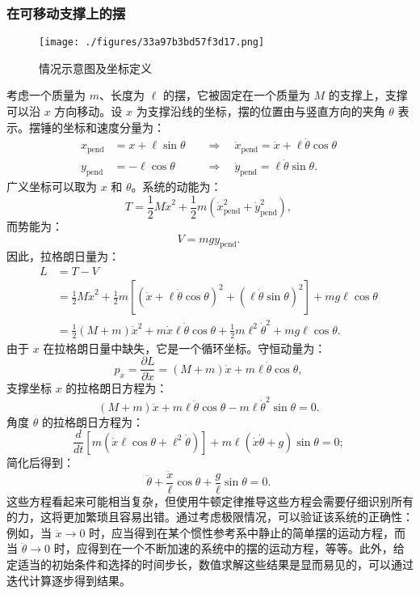 \subsubsection{在可移动支撑上的摆}
\begin{figure}[ht]
\centering
\texttt{[image: ./figures/33a97b3bd57f3d17.png]}
\caption{情况示意图及坐标定义} \label{fig_LGL_8}
\end{figure}
考虑一个质量为 \( m \)、长度为 \( \ell \) 的摆，它被固定在一个质量为 \( M \) 的支撑上，支撑可以沿 \( x \) 方向移动。设 \( x \) 为支撑沿线的坐标，摆的位置由与竖直方向的夹角 \( \theta \) 表示。摆锤的坐标和速度分量为：
\[
\begin{array}{rll}
x_{\mathrm{pend}} &= x + \ell \sin \theta & \quad \Rightarrow \quad \dot{x}_{\mathrm{pend}} = \dot{x} + \ell \dot{\theta} \cos \theta \\
y_{\mathrm{pend}} &= -\ell \cos \theta & \quad \Rightarrow \quad \dot{y}_{\mathrm{pend}} = \ell \dot{\theta} \sin \theta.
\end{array}~
\]
广义坐标可以取为 \( x \) 和 \( \theta \)。系统的动能为：
\[
T = \frac{1}{2} M \dot{x}^2 + \frac{1}{2} m \left( \dot{x}_{\mathrm{pend}}^2 + \dot{y}_{\mathrm{pend}}^2 \right),~
\]
而势能为：
\[
V = mg y_{\mathrm{pend}}.~
\]
因此，拉格朗日量为：
\begin{equation}
\begin{aligned}
L &= T - V\\
 &= \frac{1}{2} M \dot{x}^2 + \frac{1}{2} m \left[ \left( \dot{x} + \ell \dot{\theta} \cos \theta \right)^2 + \left( \ell \dot{\theta} \sin \theta \right)^2 \right] + mg \ell \cos \theta \\
 &= \frac{1}{2} (M + m) \dot{x}^2 + m \dot{x} \ell \dot{\theta} \cos \theta + \frac{1}{2} m \ell^2 \dot{\theta}^2 + mg \ell \cos \theta.
\end{aligned}~
\end{equation}
由于 \( x \) 在拉格朗日量中缺失，它是一个循环坐标。守恒动量为：
\[
p_{x} = \frac{\partial L}{\partial \dot{x}} = (M + m) \dot{x} + m \ell \dot{\theta} \cos \theta,~
\]
支撑坐标 \( x \) 的拉格朗日方程为：
\[
(M + m) \ddot{x} + m \ell \ddot{\theta} \cos \theta - m \ell \dot{\theta}^2 \sin \theta = 0.~
\]
角度 \( \theta \) 的拉格朗日方程为：
\[
\frac{d}{dt}\left[m(\dot{x} \ell \cos \theta + \ell^2 \dot{\theta})\right] + m \ell (\dot{x} \dot{\theta} + g) \sin \theta = 0;~
\]
简化后得到：
\[
\ddot{\theta} + \frac{\ddot{x}}{\ell} \cos \theta + \frac{g}{\ell} \sin \theta = 0.~
\]
这些方程看起来可能相当复杂，但使用牛顿定律推导这些方程会需要仔细识别所有的力，这将更加繁琐且容易出错。通过考虑极限情况，可以验证该系统的正确性：例如，当 \( \ddot{x} \to 0 \) 时，应当得到在某个惯性参考系中静止的简单摆的运动方程，而当 \( \ddot{\theta} \to 0 \) 时，应得到在一个不断加速的系统中的摆的运动方程，等等。此外，给定适当的初始条件和选择的时间步长，数值求解这些结果是显而易见的，可以通过迭代计算逐步得到结果。
